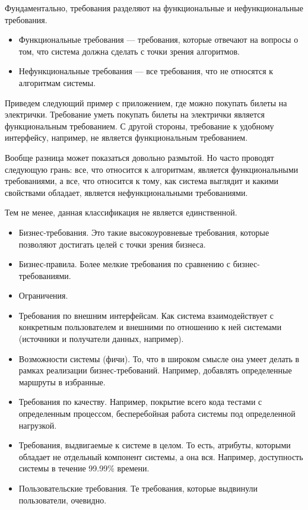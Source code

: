     \begin{Def}
        Фундаментально, требования разделяют на функциональные и нефункциональные требования.

        \begin{itemize}
            \item Функциональные требования --- требования, которые отвечают на вопросы о том, что система должна сделать с точки зрения алгоритмов.
            \item Нефункциональные требования --- все требования, что не относятся к алгоритмам системы.
        \end{itemize}
        
        Приведем следующий пример с приложением, где можно покупать билеты на электрички. Требование уметь покупать билеты на электрички является функциональным требованием. С другой стороны, требование к удобному интерфейсу, например, не является функциональным требованием.

        Вообще разница может показаться довольно размытой. Но часто проводят следующую грань: все, что относится к алгоритмам, является функциональными требованиями, а все, что относится к тому, как система выглядит и какими свойствами обладает, является нефункциональными требованиями.

        Тем не менее, данная классификация не является единственной.

        \begin{itemize}
            \item Бизнес-требования. Это такие высокоуровневые требования, которые позволяют достигать целей с точки зрения бизнеса.

            \item Бизнес-правила. Более мелкие требования по сравнению с бизнес-требованиями.

            \item Ограничения.

            \item Требования по внешним интерфейсам. Как система взаимодействует с конкретным пользователем и внешними по отношению к ней системами (источники и получатели данных, например).

            \item Возможности системы (фичи). То, что в широком смысле она умеет делать в рамках реализации бизнес-требований. Например, добавлять определенные маршруты в избранные.

            \item Требования по качеству. Например, покрытие всего кода тестами с определенным процессом, бесперебойная работа системы под определенной нагрузкой.

            \item Требования, выдвигаемые к системе в целом. То есть, атрибуты, которыми обладает не отдельный компонент системы, а она вся. Например, доступность системы в течение 99.99\% времени.

            \item Пользовательские требования. Те требования, которые выдвинули пользователи, очевидно. 
        \end{itemize}
    \end{Def}

